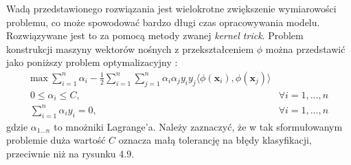 \documentclass[notitlepage]{report}
\begin{document}
Wadą przedstawionego rozwiązania jest wielokrotne zwiększenie wymiarowości problemu, co może spowodować bardzo długi czas opracowywania modelu. Rozwiązywane jest to za pomocą metody zwanej \textit{kernel trick}. 
Problem konstrukcji maszyny wektorów nośnych z przekształceniem $\phi$ można przedstawić jako poniższy problem optymalizacyjny \cite{eslii}:
\begin{equation}
\begin{array}{ll}
\text{max}\ \sum_{i=1}^{n}\alpha_i - \frac{1}{2}\sum_{i=1}^{n}\sum_{j=1}^{n}\alpha_i\alpha_jy_iy_j\langle\phi(\mathbf{x}_i),\phi(\mathbf{x}_j)\rangle &\\
0 \le \alpha_i \le C, & \forall i = 1,...,n  \\
\sum_{i=1}^{n}\alpha_iy_i = 0, & \forall i = 1,...,n
\end{array}
\end{equation}
gdzie $\alpha_{1...n}$ to mnożniki Lagrange'a. Należy zaznaczyć, że w tak sformułowanym problemie duża wartość $C$ oznacza małą tolerancję na błędy klasyfikacji, przeciwnie niż na rysunku 4.9. 
\end{document}
